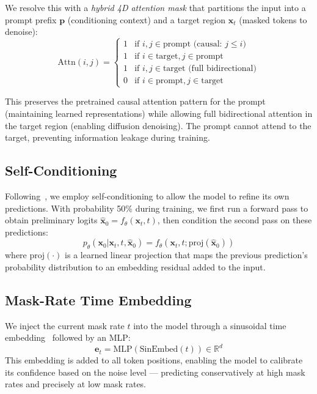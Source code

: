 \documentclass{article}
\newcommand{\R}{\mathbb{R}}
\begin{document}
We resolve this with a \emph{hybrid 4D attention mask} that partitions the input into a prompt prefix $\mathbf{p}$ (conditioning context) and a target region $\mathbf{x}_t$ (masked tokens to denoise):
\begin{equation}
    \text{Attn}(i, j) = \begin{cases}
        1 & \text{if } i, j \in \text{prompt (causal: } j \leq i\text{)} \\
        1 & \text{if } i \in \text{target}, j \in \text{prompt} \\
        1 & \text{if } i, j \in \text{target (full bidirectional)} \\
        0 & \text{if } i \in \text{prompt}, j \in \text{target}
    \end{cases}
\end{equation}

This preserves the pretrained causal attention pattern for the prompt (maintaining learned representations) while allowing full bidirectional attention in the target region (enabling diffusion denoising). The prompt cannot attend to the target, preventing information leakage during training.

\subsection{Self-Conditioning}
\label{sec:method:selfcond}

Following~\citet{chen2023analog}, we employ self-conditioning to allow the model to refine its own predictions. With probability 50\% during training, we first run a forward pass to obtain preliminary logits $\hat{\mathbf{x}}_0 = f_\theta(\mathbf{x}_t, t)$, then condition the second pass on these predictions:
\begin{equation}
    p_\theta(\mathbf{x}_0 | \mathbf{x}_t, t, \hat{\mathbf{x}}_0) = f_\theta(\mathbf{x}_t, t; \text{proj}(\hat{\mathbf{x}}_0))
\end{equation}
where $\text{proj}(\cdot)$ is a learned linear projection that maps the previous prediction's probability distribution to an embedding residual added to the input.

\subsection{Mask-Rate Time Embedding}
\label{sec:method:time}

We inject the current mask rate $t$ into the model through a sinusoidal time embedding~\citep{vaswani2017attention} followed by an MLP:
\begin{equation}
    \mathbf{e}_t = \text{MLP}(\text{SinEmbed}(t)) \in \R^{d}
\end{equation}
This embedding is added to all token positions, enabling the model to calibrate its confidence based on the noise level --- predicting conservatively at high mask rates and precisely at low mask rates.
\end{document}
